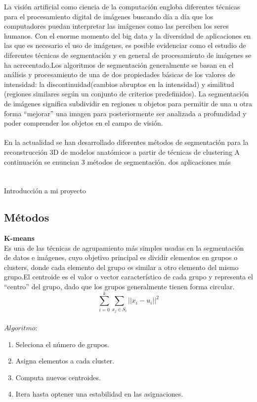\documentclass[10pt,twocolumn,letterpaper]{article}
\begin{document}
La visión artificial como ciencia de la computación engloba diferentes técnicas para el procesamiento digital de imágenes buscando día a día que los 
computadores puedan interpretar las imágenes como las perciben los seres humanos. Con el enorme momento del big data y la diversidad de aplicaciones 
en las que es necesario el uso de imágenes, es posible evidenciar como el estudio de diferentes técnicas de segmentación y en general de procesamiento
de imágenes se ha acrecentado.Los algoritmos de segmentación generalmente se basan en el análisis y procesamiento de una de dos propiedades básicas de
los valores de intensidad: la discontinuidad(cambios abruptos en la intensidad) y similitud (regiones similares según un conjunto de criterios predefinidos).
La segmentación de imágenes significa subdividir en regiones u objetos para permitir de una u otra forma “mejorar” una imagen para posteriormente ser analizada a 
profundidad y poder comprender los objetos en el campo de visión. 
\\
\\
En la actualidad se han desarrollado diferentes métodos de segmentación para la reconstrucción 3D de modelos anatómicos a partir de técnicas de clustering  
A continuación se enuncian 3 métodos de segmentación.\cite{RODRIGUEZ1997} 
dos aplicaciones más 
\\
\\
\\
Introducción a mi proyecto 


\subsection{Métodos}
\textbf{K-means}
\\
Es una de las técnicas de agrupamiento más simples usadas en la segmentación de datos e imágenes, cuyo objetivo principal es dividir elementos en grupos o clusters, donde cada
elemento del grupo es similar a otro elemento del mismo grupo.El centroide es el valor o vector característico de cada grupo y representa el “centro” del grupo, dado que los
grupos generalmente tienen forma circular.
\begin{equation}\label{eq:1}
\sum_{i=0}^k \sum_{x_j\in S_i}||x_{i}-u_{i}||^2 
\end{equation}
\newline
\\
$Algoritmo:$
\begin{enumerate}
\item Seleciona el número de grupos.
\item Asigna elementos a cada cluster.
\item Computa nuevos centroides.
\item Itera hasta optener una estabilidad en las asignaciones.
\end{enumerate}
\end{document}
